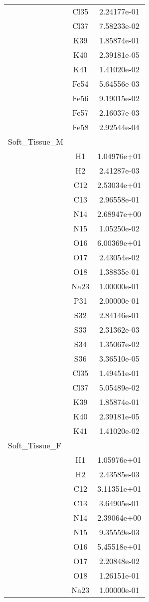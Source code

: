 \begin{centering}
\begin{longtable}{l c c}
& Cl35 & 2.24177e-01 \\ 
& Cl37 & 7.58233e-02 \\ 
& K39 & 1.85874e-01 \\ 
& K40 & 2.39181e-05 \\ 
& K41 & 1.41020e-02 \\ 
& Fe54 & 5.64556e-03 \\ 
& Fe56 & 9.19015e-02 \\ 
& Fe57 & 2.16037e-03 \\ 
& Fe58 & 2.92544e-04 \\ 
\hline
Soft\_Tissue\_M & & \\
\hline
& H1 & 1.04976e+01 \\ 
& H2 & 2.41287e-03 \\ 
& C12 & 2.53034e+01 \\ 
& C13 & 2.96558e-01 \\ 
& N14 & 2.68947e+00 \\ 
& N15 & 1.05250e-02 \\ 
& O16 & 6.00369e+01 \\ 
& O17 & 2.43054e-02 \\ 
& O18 & 1.38835e-01 \\ 
& Na23 & 1.00000e-01 \\ 
& P31 & 2.00000e-01 \\ 
& S32 & 2.84146e-01 \\ 
& S33 & 2.31362e-03 \\ 
& S34 & 1.35067e-02 \\ 
& S36 & 3.36510e-05 \\ 
& Cl35 & 1.49451e-01 \\ 
& Cl37 & 5.05489e-02 \\ 
& K39 & 1.85874e-01 \\ 
& K40 & 2.39181e-05 \\ 
& K41 & 1.41020e-02 \\ 
\hline
Soft\_Tissue\_F & & \\
\hline
& H1 & 1.05976e+01 \\ 
& H2 & 2.43585e-03 \\ 
& C12 & 3.11351e+01 \\ 
& C13 & 3.64905e-01 \\ 
& N14 & 2.39064e+00 \\ 
& N15 & 9.35559e-03 \\ 
& O16 & 5.45518e+01 \\ 
& O17 & 2.20848e-02 \\ 
& O18 & 1.26151e-01 \\ 
& Na23 & 1.00000e-01 \\ 

\end{longtable}
\end{centering}
